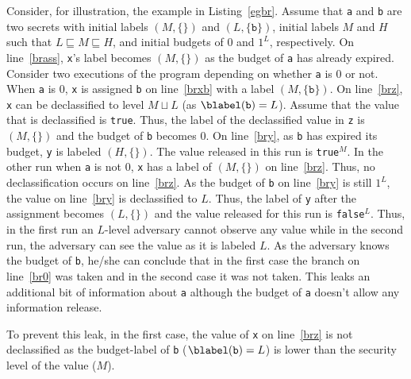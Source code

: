 Consider, for illustration, the example in Listing~\ref{egbr}. Assume
that \texttt{a} and \texttt{b} are two secrets with initial labels
$(M, \{\})$ and $(L, \{\texttt{b}\})$, initial labels $M$ and $H$ such
that $L \sqsubseteq M \sqsubseteq H$, and initial budgets of $0$ and
$1^L$, respectively. On line~\ref{brass}, \texttt{x}'s label becomes
$(M, \{\})$ as the budget of \texttt{a} has already expired. Consider
two executions of the program depending on whether \texttt{a} is $0$
or not. When \texttt{a} is $0$, \texttt{x} is assigned \texttt{b} on
line~\ref{brxb} with a label $(M, \{\texttt{b}\})$. On line~\ref{brz},
\texttt{x} can be declassified to level $M \sqcup L$ (as
$\blabel(\texttt{b}) = L$). Assume that the value that is declassified
is \texttt{true}. Thus, the label of the declassified value in
\texttt{z} is $(M, \{\})$ and the budget of \texttt{b} becomes $0$. On
line~\ref{bry}, as \texttt{b} has expired its budget, \texttt{y} is
labeled $(H, \{\})$. The value released in this run is
\texttt{true}$^M$.  In the other run when \texttt{a} is not $0$,
\texttt{x} has a label of $(M, \{\})$ on line~\ref{brz}. Thus, no
declassification occurs on line~\ref{brz}. As the budget of \texttt{b}
on line~\ref{bry} is still $1^L$, the value on line~\ref{bry} is
declassified to $L$. Thus, the label of \texttt{y} after the
assignment becomes $(L, \{\})$ and the value released for this run is
\texttt{false}$^L$.  Thus, in the first run an $L$-level adversary
cannot observe any value while in the second run, the adversary can
see the value as it is labeled $L$. As the adversary knows the budget
of \texttt{b}, he/she can conclude that in the first case the branch on
line~\ref{br0} was taken and in the second case it was not taken. This
leaks an additional bit of information about \texttt{a} although the
budget of \texttt{a} doesn't allow any information release.

To prevent this leak, in the first case, the value of \texttt{x} on
line~\ref{brz} is not declassified as the budget-label of
\texttt{b} ($\blabel(\texttt{b}) = L$) is lower than the
security level of the value ($M$).


